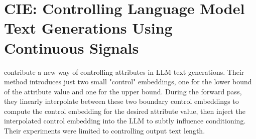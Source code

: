 \section{CIE: Controlling Language Model Text Generations Using Continuous Signals}

\textcite{samuel2025CIEControllingLanguage} contribute a new way of controlling attributes in LLM text generations. Their method introduces just two small "control" embeddings, one for the lower bound of the attribute value and one for the upper bound. During the forward pass, they linearly interpolate between these two boundary control embeddings to compute the control embedding for the desired attribute value, then inject the interpolated control embedding into the LLM to subtly influence conditioning. Their experiments were limited to controlling output text length. 